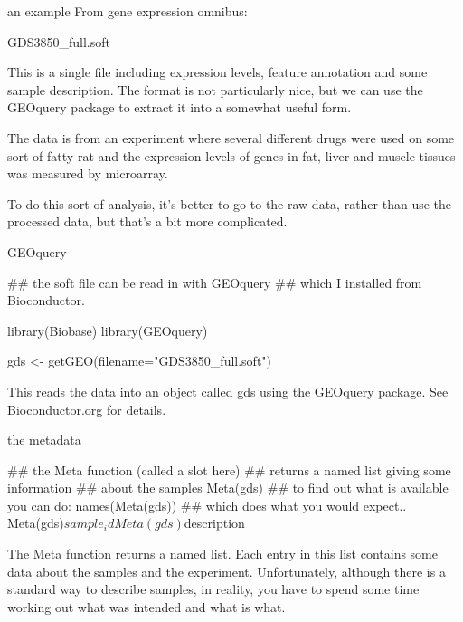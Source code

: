 \documentclass[pdf]{beamer}
\begin{document}
\begin{frame}{an example}
  From gene expression omnibus:
  
  GDS3850\_full.soft

  This is a single file including expression levels, feature annotation
  and some sample description. The format is not particularly nice, but
  we can use the GEOquery package to extract it into a somewhat useful form.

  The data is from an experiment where several different drugs were used
  on some sort of fatty rat and the expression levels of genes in fat,
  liver and muscle tissues was measured by microarray.

  To do this sort of analysis, it's better to go to the raw data, rather than
  use the processed data, but that's a bit more complicated.
\end{frame}

\begin{frame}[fragile]{GEOquery}
\begin{rcode}
## the soft file can be read in with GEOquery
## which I installed from Bioconductor.

library(Biobase)
library(GEOquery)

gds <- getGEO(filename="GDS3850_full.soft")
\end{rcode}

This reads the data into an object called gds using the GEOquery package.
See Bioconductor.org for details.
\end{frame}

\begin{frame}[fragile]{the metadata}
  \begin{rcode}
    ## the Meta function (called a slot here)
    ## returns a named list giving some information
    ## about the samples
    Meta(gds)
    ## to find out what is available you can do:
    names(Meta(gds))
    ## which does what you would expect..
    Meta(gds)$sample_id
    Meta(gds)$description
  \end{rcode}

  The Meta function returns a named list. Each entry in this list contains
  some data about the samples and the experiment. Unfortunately, although
  there is a standard way to describe samples, in reality, you have to spend
  some time working out what was intended and what is what.
\end{frame}
\end{document}

